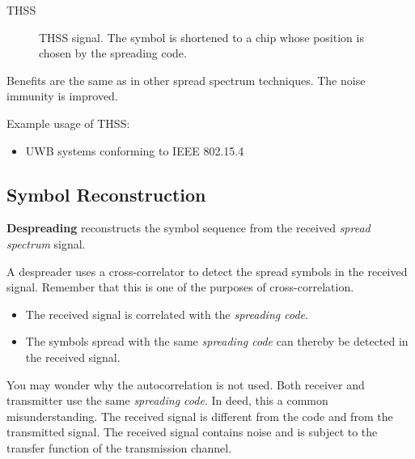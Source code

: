 \begin{refsection}
\begin{example}{\acs{THSS}}
\begin{figure}[H]
{
		}
		
		\caption[\ac{THSS} signal]{\ac{THSS} signal. The symbol is shortened to a chip whose position is chosen by the spreading code.}
	\end{figure}
\end{example}

Benefits are the same as in other spread spectrum techniques. The noise immunity is improved.

Example usage of \ac{THSS}:
\begin{itemize}
	\item \ac{UWB} systems conforming to \acs{IEEE} 802.15.4
\end{itemize}

\subsection{Symbol Reconstruction}

 \textbf{Despreading} reconstructs the symbol sequence from the received \emph{spread spectrum} signal.

A despreader uses a cross-correlator to detect the spread symbols in the received signal. Remember that this is one of the purposes of cross-correlation.
\begin{itemize}
	\item The received signal is correlated with the \emph{spreading code}.
	\item The symbols spread with the same \emph{spreading code} can thereby be detected in the received signal.
\end{itemize}

\begin{remark}
	You may wonder why the autocorrelation is not used. Both receiver and transmitter use the same \emph{spreading code}. In deed, this a common misunderstanding. The received signal is different from the code and from the transmitted signal. The received signal contains noise and is subject to the transfer function of the transmission channel.
\end{remark}


\end{refsection}
